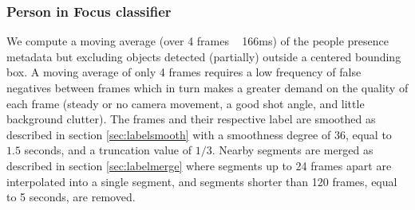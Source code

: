 \subsubsection{Person in Focus classifier}\label{sec:infocus}
%
We compute a moving average (over 4 frames ~ 166ms)%
of the people presence metadata but excluding objects detected (partially) outside a centered bounding box.
A moving average of only 4 frames requires a low frequency of false negatives between frames which in turn makes a greater demand on the quality of each frame (steady or no camera movement, a good shot angle, and little background clutter). The frames and their respective label are smoothed as described in section \ref{sec:labelsmooth} with a smoothness degree of 36,%
equal to $1.5$ seconds, and a truncation value of $1/3$.%
 Nearby segments are merged as described in section \ref{sec:labelmerge} where segments up to 24%
  frames apart are interpolated into a single segment, and segments shorter than 120%
  frames, equal to 5 seconds, are removed.
%
%
